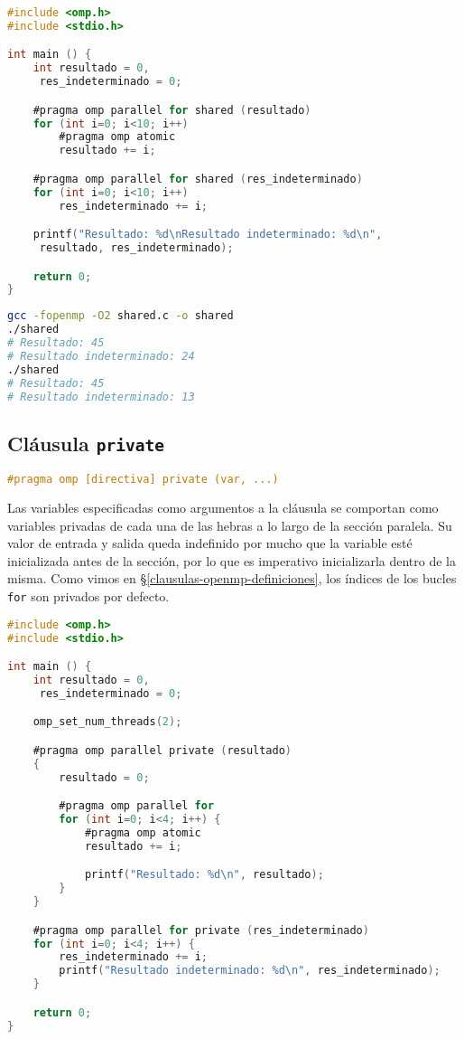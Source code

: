 \pagebreak

\begin{lstlisting}[language=C]
#include <omp.h>
#include <stdio.h>

int main () {
	int resultado = 0,
	 res_indeterminado = 0;

	#pragma omp parallel for shared (resultado)
	for (int i=0; i<10; i++)
		#pragma omp atomic
		resultado += i;

	#pragma omp parallel for shared (res_indeterminado)
	for (int i=0; i<10; i++)
		res_indeterminado += i;

	printf("Resultado: %d\nResultado indeterminado: %d\n",
	 resultado, res_indeterminado);

	return 0;
}
\end{lstlisting}

\begin{lstlisting}[language=sh]
gcc -fopenmp -O2 shared.c -o shared
./shared
# Resultado: 45
# Resultado indeterminado: 24
./shared
# Resultado: 45
# Resultado indeterminado: 13
\end{lstlisting}

\subsection{Cláusula \texttt{private}}

\begin{lstlisting}[language=C]
#pragma omp [directiva] private (var, ...)
\end{lstlisting}

Las variables especificadas como argumentos a la cláusula se comportan como variables privadas de cada una de las hebras a lo largo de la sección paralela.
Su valor de entrada y salida queda indefinido por mucho que la variable esté inicializada antes de la sección, por lo que es imperativo inicializarla dentro de la misma.
Como vimos en \S\ref{clausulas-openmp-definiciones}, los índices de los bucles \texttt{for} son privados por defecto.

\begin{lstlisting}[language=C]
#include <omp.h>
#include <stdio.h>

int main () {
	int resultado = 0,
	 res_indeterminado = 0;

	omp_set_num_threads(2);

	#pragma omp parallel private (resultado)
	{
		resultado = 0;

		#pragma omp parallel for
		for (int i=0; i<4; i++) {
			#pragma omp atomic
			resultado += i;

			printf("Resultado: %d\n", resultado);
		}
	}

	#pragma omp parallel for private (res_indeterminado)
	for (int i=0; i<4; i++) {
		res_indeterminado += i;
		printf("Resultado indeterminado: %d\n", res_indeterminado);
	}

	return 0;
}
\end{lstlisting}

